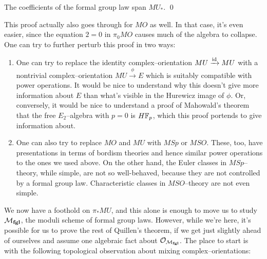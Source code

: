\begin{corollary}\label{QuillenSurjective}
The coefficients of the formal group law span $MU_*$. \qed
\end{corollary}

\begin{remark}
This proof actually also goes through for $MO$ as well.  In that case, it's even easier, since the equation $2 = 0$ in $\pi_0 MO$ causes much of the algebra to collapse.  One can try to further perturb this proof in two ways:
\begin{enumerate}
\item One can try to replace the identity complex--orientation $MU \xrightarrow{\mathrm{id}} MU$ with a nontrivial complex--orientation $MU \xrightarrow{\phi} E$ which is suitably compatible with power operations.  It would be nice to understand why this doesn't give more information about $E$ than what's visible in the Hurewicz image of $\phi$.  Or, conversely, it would be nice to understand a proof of Mahowald's theorem that the free $E_2$--algebra with $p = 0$ is $H\mathbb F_p$, which this proof portends to give information about.
\item One can also try to replace $MO$ and $MU$ with $MSp$ or $MSO$.  These, too, have presentations in terms of bordism theories and hence similar power operations to the ones we used above.  On the other hand, the Euler classes in $MSp$--theory, while simple, are not so well-behaved, because they are not controlled by a formal group law.  Characteristic classes in $MSO$--theory are not even simple.
\end{enumerate}
\end{remark}

We now have a foothold on $\pi_* MU$, and this alone is enough to move us to study $\mathcal{M}_{\mathbf{fgl}}$, the moduli scheme of formal group laws.  However, while we're here, it's possible for us to prove the rest of Quillen's theorem, if we get just slightly ahead of ourselves and assume one algebraic fact about $\mathcal{O}_{\mathcal{M}_{\mathbf{fgl}}}$.  The place to start is with the following topological observation about mixing complex--orientations:

